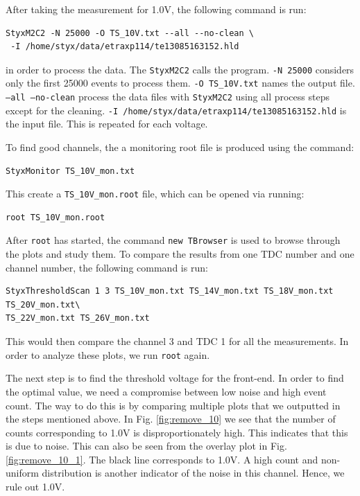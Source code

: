 \documentclass[a4paper]{report}
\numberwithin{equation}{section}
\begin{document}
After taking the measurement for 1.0V, the following command is run:

\begin{tcolorbox}
\begin{verbatim}
StyxM2C2 -N 25000 -O TS_10V.txt --all --no-clean \ 
 -I /home/styx/data/etraxp114/te13085163152.hld
\end{verbatim}
\end{tcolorbox}

\noindent in order to process the data. The \texttt{StyxM2C2} calls the program. \texttt{-N 25000} considers only the first 25000 events to process them. \texttt{-O TS\_10V.txt} names the output file. \texttt{--all --no-clean} process the data files with \texttt{StyxM2C2} using all process steps except for the cleaning. \texttt{-I \slash home\slash styx\slash data\slash etraxp114\slash te13085163152.hld} is the input file. This is repeated for each voltage. 

To find good channels, the a monitoring root file is produced using the command: 

\begin{tcolorbox}
\begin{verbatim}
StyxMonitor TS_10V_mon.txt
\end{verbatim}
\end{tcolorbox}
\noindent This create a \texttt{TS\_10V\_mon.root} file, which can be opened via running:

\begin{tcolorbox}
\begin{verbatim}
root TS_10V_mon.root
\end{verbatim}
\end{tcolorbox}
\noindent After \texttt{root} has started, the command \texttt{new TBrowser} is used to browse through the plots and study them. To compare the results from one TDC number and one channel number, the following command is run: 

\begin{tcolorbox}
\begin{verbatim}
StyxThresholdScan 1 3 TS_10V_mon.txt TS_14V_mon.txt TS_18V_mon.txt TS_20V_mon.txt\ 
TS_22V_mon.txt TS_26V_mon.txt
\end{verbatim}
\end{tcolorbox}
\noindent This would then compare the channel 3 and TDC 1 for all the measurements. In order to analyze these plots, we run \texttt{root} again. 

The next step is to find the threshold voltage for the front-end. In order to find the optimal value, we need a compromise between low noise and high event count. The way to do this is by comparing multiple plots that we outputted in the steps mentioned above. In Fig. \ref{fig:remove_10} we see that the number of counts corresponding to 1.0V is disproportionately high. This indicates that this is due to noise. This can also be seen from the overlay plot in Fig. \ref{fig:remove_10_1}. The black line corresponds to 1.0V. A high count and non-uniform distribution is another indicator of the noise in this channel. Hence, we rule out 1.0V. 
\end{document}
